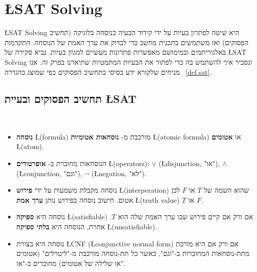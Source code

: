 
\section{\L{\normalsize SAT Solving}}\label{s.sat}

\L{SAT Solving}
היא שיטה לפתרון בעיות על ידי קידוד הבעיה כנוסחה בלוגיקה (תחשיב הפסוקים) ואז משתמשים בתכנית מחשב כדי לבדוק את ערך האמת של הנוסחה. התקדמות באלגוריתמים ובמימושם מאפשרות פתרונות מעשיים למגוון בעיות. נביא סקירה של 
\L{SAT Solving}
ונסביר איך להשתמש בה כדי לפתור את הבעיות המתמטיות שתיארנו בפרק זה. אנו מניחים שלקורא ידע בסיסי בתחשיב הפסוקים כפי שמוצג בהגדרה%
~\ref{def.sat}.

\newpage

\subsection{תחשיב הפסוקים ובעיית \L{SAT}}

\begin{definition}\label{def.sat}
\mbox{}\\
\vspace{-4ex}
\begin{itemize}
\item
\textbf{נוסחה}
\L{(formula)}
מורכבת מ-%
\textbf{נוסחאות אטומיות}
\L{(atomic formula)}
או
\textbf{אטומים}
\L{(atom)}.

\item 
הנוסחאות מחוברת ב-%
\textbf{אופרטורים}
\L{(operators)}:
$\vee$ (\L{disjunction}, "או"),
$\wedge$ (\L{conjunction}, "וגם"),
$\neg$ (\L{negation}, "לא").

\item
נוסחה מקבלת משמעות על ידי 
\textbf{פירוש}
\L{(interperation)}
שהוא השמה של
$T$
או
$F$
לכן אטום. חישוב נוסחה בפירוש נותן 
\textbf{ערך אמת}
\L{(truth value)}
$T$
או
$F$. 

\item
נוסחה היא
\textbf{ספיקה}
\L{(satisfiable)}
אם ורק אם קיים פירוש שבו ערך האמת שלה הוא
$T$.
אחרת, הנוסחה היא
\textbf{בלתי ספיקה}
\L{(unsatisfiable)}.

\item
נוסחה היא בצורת
\L{CNF}
(\L{conjunctive normal form})
אם ורק אם היא מורכת מתת-נוסחאות המחוברות ב-"וגם", כאשר כל תת-נוסחה מורכבת מ-"ליטרלים" (אטומים או שלילה של אטומים) מחוברים ב-"או".
\end{itemize}
\end{definition}

